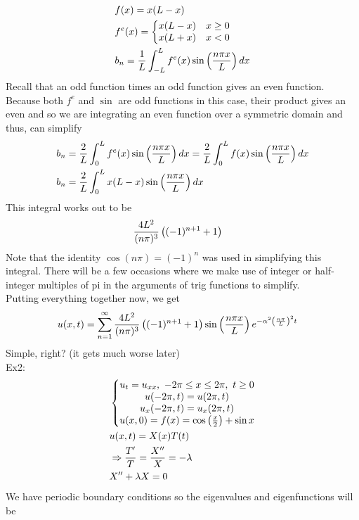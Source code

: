 \documentclass[11pt, fleqn]{article}
\begin{document}
\begin{align*}
    &f(x)=x(L-x)\\
    &f^e(x)=\left\{\begin{matrix} x(L-x) & x\geq 0\\ x(L+x) & x<0 \end{matrix}\right.\\
    &b_n=\frac{1}{L}\int_{-L}^Lf^e(x)\sin\left( \frac{n\pi x}{L} \right)dx
\end{align*}
Recall that an odd function times an odd function gives an even function. Because both $f^e$ and $\sin$ are odd functions in this case, their product gives an even and so we are integrating an even function over a symmetric domain and thus, can simplify
\begin{align*}
    &b_n=\frac{2}{L}\int_0^Lf^e(x)\sin\left( \frac{n\pi x}{L} \right)dx=\frac{2}{L}\int_0^Lf(x)\sin\left( \frac{n\pi x}{L} \right)dx\\
    &b_n=\frac{2}{L}\int_0^Lx(L-x)\sin\left( \frac{n\pi x}{L} \right)dx
\end{align*}
This integral works out to be
\begin{align*}
    &\frac{4L^2}{(n\pi)^3}\left( (-1)^{n+1}+1 \right)
\end{align*}
Note that the identity $\cos(n\pi)=(-1)^n$ was used in simplifying this integral. There will be a few occasions where we make use of integer or half-integer multiples of pi in the arguments of trig functions to simplify.\\
Putting everything together now, we get
\begin{align*}
    &u(x,t)=\sum_{n=1}^\infty\frac{4L^2}{(n\pi)^3}\left( (-1)^{n+1}+1 \right)\sin\left( \frac{n\pi x}{L} \right)e^{-\alpha^2\left( \frac{n\pi}{L} \right)^2t}
\end{align*}
Simple, right? (it gets much worse later)\\
Ex2:
\begin{align*}
    &\left\{\begin{matrix} u_t=u_{xx},\ -2\pi\leq x\leq 2\pi,\ t\geq0\\ u(-2\pi,t)=u(2\pi,t)\\ u_x(-2\pi,t)=u_x(2\pi,t)\\ u(x,0)=f(x)=\cos\left( \frac{x}{2} \right)+\sin x \end{matrix}\right.\\
    &u(x,t)=X(x)T(t)\\
    &\Rightarrow \frac{T'}{T}=\frac{X''}{X}=-\lambda\\
    &X''+\lambda X=0
\end{align*}
We have periodic boundary conditions so the eigenvalues and eigenfunctions will be
\end{document}
